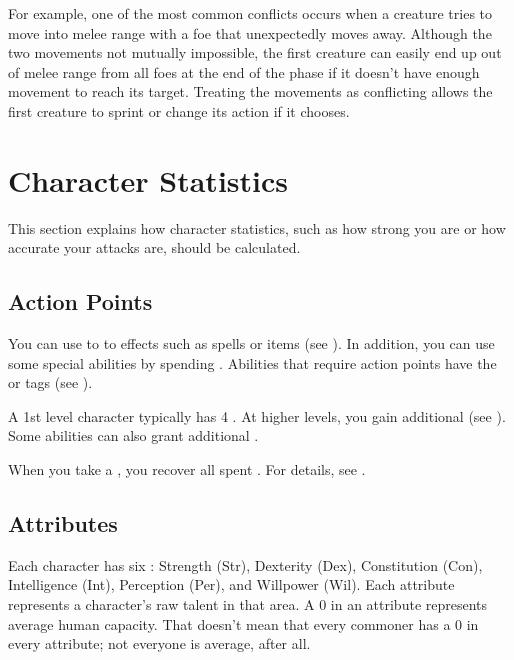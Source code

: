             For example, one of the most common conflicts occurs when a creature tries to move into melee range with a foe that unexpectedly moves away.
            Although the two movements not mutually impossible, the first creature can easily end up out of melee range from all foes at the end of the phase if it doesn't have enough movement to reach its target.
            Treating the movements as conflicting allows the first creature to sprint or change its action if it chooses.

\section{Character Statistics}
    This section explains how character statistics, such as how strong you are or how accurate your attacks are, should be calculated.

    \subsection{Action Points}\label{Action Points}
        You can use  to  to effects such as spells or items (see ).
        In addition, you can use some special abilities by spending .
        Abilities that require action points have the  or  tags (see ).

        A 1st level character typically has 4 .
        At higher levels, you gain additional  (see ).
        Some abilities can also grant additional .

        When you take a , you recover all spent .
        For details, see .

    \subsection{Attributes}\label{Attributes}

        Each character has six : Strength (Str), Dexterity (Dex), Constitution (Con), Intelligence (Int), Perception (Per), and Willpower (Wil).
        Each attribute represents a character's raw talent in that area.
        A 0 in an attribute represents average human capacity.
        That doesn't mean that every commoner has a 0 in every attribute; not everyone is average, after all.


